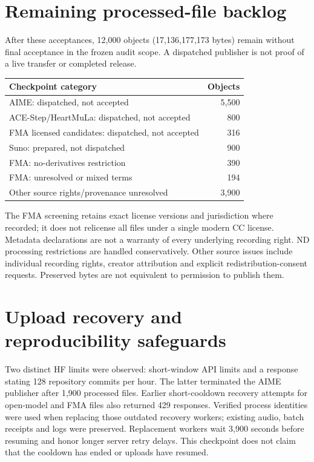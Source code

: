 \documentclass[11pt]{article}
\begin{document}
\section{Remaining processed-file backlog}
After these acceptances, 12,000 objects (17,136,177,173 bytes) remain without
final acceptance in the frozen audit scope. A dispatched publisher is not
proof of a live transfer or completed release.
\begin{center}
\begin{tabular}{lr}
\toprule
Checkpoint category & Objects \\
\midrule
AIME: dispatched, not accepted & 5,500 \\
ACE-Step/HeartMuLa: dispatched, not accepted & 800 \\
FMA licensed candidates: dispatched, not accepted & 316 \\
Suno: prepared, not dispatched & 900 \\
FMA: no-derivatives restriction & 390 \\
FMA: unresolved or mixed terms & 194 \\
Other source rights/provenance unresolved & 3,900 \\
\bottomrule
\end{tabular}
\end{center}
The FMA screening retains exact license versions and jurisdiction where
recorded; it does not relicense all files under a single modern CC license.
Metadata declarations are not a warranty of every underlying recording right.
ND processing restrictions are handled conservatively. Other source issues
include individual recording rights, creator attribution and explicit
redistribution-consent requests. Preserved bytes are not equivalent to
permission to publish them.

\section{Upload recovery and reproducibility safeguards}
Two distinct HF limits were observed: short-window API limits and a response
stating 128 repository commits per hour. The latter terminated the AIME
publisher after 1,900 processed files. Earlier short-cooldown recovery attempts
for open-model and FMA files also returned 429 responses. Verified process
identities were used when replacing those outdated recovery workers; existing
audio, batch receipts and logs were preserved. Replacement workers wait
3,900 seconds before resuming and honor longer server retry delays. This
checkpoint does not claim that the cooldown has ended or uploads have resumed.
\end{document}
